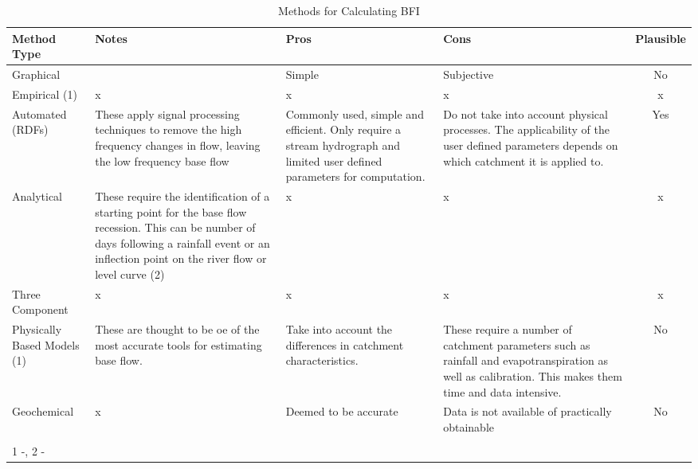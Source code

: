 \documentclass[DIV=calc, paper=a4, fontsize=11pt, twocolumn]{scrartcl}	 %
\begin{document}
\begin{table*}
\caption{Methods for Calculating BFI}
\centering
\begin{tabularx}{\textwidth}{ X X X X c} 
		\toprule
\textbf{Method Type} & \textbf{Notes} & \textbf{Pros} & \textbf{Cons} & \textbf{Plausible}\\
		\midrule	
Graphical &  & Simple & Subjective & No \\
		
Empirical  (1) & x  & x & x & x \\

Automated (RDFs) & These apply signal processing techniques to remove the high frequency changes in flow, leaving the low frequency base flow & Commonly used, simple and efficient. Only require a stream hydrograph and limited user defined parameters for computation. & Do not take into account physical processes. The applicability of the user defined parameters depends on which catchment it is applied to. & Yes \\
		
Analytical & These require the identification of a starting point for the base flow recession. This can be  number of days following a rainfall event or an inflection point on the river flow or level curve (2) &x &x &x \\
		
Three Component &x  &x & x&x \\

Physically Based Models (1) & These are thought to be oe of the most accurate tools for estimating base flow.  & Take into account the differences in catchment characteristics. & These require a number of catchment parameters such as rainfall and evapotranspiration as well as calibration. This makes them time and data intensive. & No \\
		
Geochemical & x & Deemed to be accurate & Data is not available of practically obtainable & No\\
	\bottomrule
	\multicolumn{5}{l}{} \\
	\multicolumn{5}{l}{
	1 -\citet{Li2013}, 2 - \citep{Nejadhashemi2007}}\\
\end{tabularx}
\end{table*}
\end{document}
